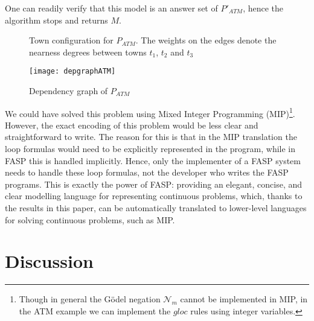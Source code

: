 \documentclass{tlp}
\begin{document}
One can readily verify that this model is an answer set of $P'_{\mathit{ATM}}$, hence the algorithm stops
and returns $M$.

\begin{figure}
 \centering
{}
 \caption{Town configuration for $P_{ATM}$. The weights on the edges denote the nearness degrees between towns $t_1$, $t_2$ and $t_3$}
 \label{fig:atm}
\end{figure}

\begin{figure}
 \centering
 \texttt{[image: depgraphATM]}
\caption{Dependency graph of $P_{ATM}$}
 \label{fig:depgraph-atm}
\end{figure}

We could have solved this problem using Mixed Integer Programming (MIP)\footnote{Though in general the G\"odel negation $\mathcal{N}_m$ cannot be implemented in MIP, in the ATM example we can implement the $\mathit{gloc}$ rules using integer variables.}. However, the exact encoding of this problem would be less clear and straightforward to write. The reason for this is that in the MIP translation the loop formulas would need to be explicitly represented in the program, while in FASP this is handled implicitly. Hence, only the implementer of a FASP system needs to handle these loop formulas, not the developer who writes the FASP programs. This is exactly the power of FASP: providing an elegant, concise, and clear modelling language for representing continuous problems, which, thanks to the results in this paper, can be automatically translated to lower-level languages for solving continuous problems, such as MIP.



\section{Discussion}\label{sec:restrict}
\end{document}

